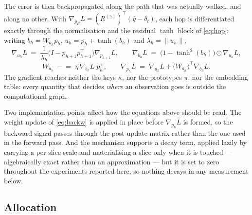 \documentclass[11pt,a4paper]{article}
\begin{document}
The error is then backpropagated along the path that was actually walked, and
along no other. With $\nabla_{p_H}L = (R^{(\gamma)})^{\top}(\hat y - \delta_t)$,
each hop is differentiated exactly through the normalisation and the residual
$\tanh$ block of \eqref{eq:hop}: writing $b_h = W_{a_h}p_h$,
$u_h = p_h + \tanh(b_h)$ and $\lambda_h = \lVert u_h\rVert$,
\begin{equation}
  \nabla_{u_h} L \;=\; \frac{1}{\lambda_h}\Big(I - p_{h+1}p_{h+1}^{\top}\Big)\nabla_{p_{h+1}} L,
  \qquad
  \nabla_{b_h} L \;=\; \big(1 - \tanh^2(b_h)\big)\odot \nabla_{u_h} L,
  \label{eq:back}
\end{equation}
\begin{equation}
  W_{a_h} \;\mathrel{-}=\; \eta\, \nabla_{b_h}L\; p_h^{\top},
  \qquad
  \nabla_{p_h} L \;=\; \nabla_{u_h} L + \big(W_{a_h}\big)^{\top} \nabla_{b_h} L .
  \label{eq:backw}
\end{equation}
The gradient reaches neither the keys $\kappa$, nor the prototypes $\pi$, nor
the embedding table: every quantity that decides \emph{where} an observation
goes is outside the computational graph.

Two implementation points affect how the equations above should be read. The
weight update of \eqref{eq:backw} is applied in place before $\nabla_{p_h}L$ is
formed, so the backward signal passes through the post-update matrix rather
than the one used in the forward pass. And the mechanism supports a decay term,
applied lazily by carrying a per-slice scale and materialising a slice only
when it is touched --- algebraically exact rather than an approximation --- but
it is set to zero throughout the experiments reported here, so nothing decays
in any measurement below.

\subsection{Allocation}
\label{sec:allocation}
\end{document}
